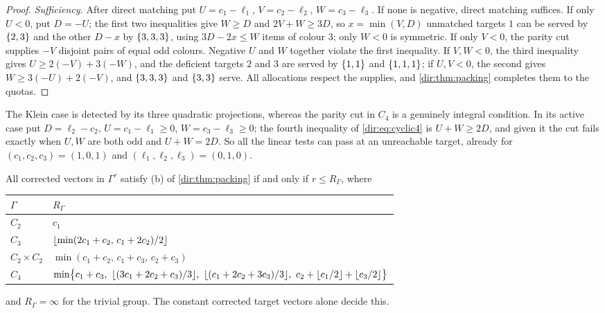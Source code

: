 \begin{proof}
\emph{Sufficiency.} After direct matching put $U=c_1-\ell_1$, $V=c_2-\ell_2$, $W=c_3-\ell_3$. If none is
negative, direct matching suffices. If only $U<0$, put $D=-U$; the first two inequalities give $W\ge D$ and
$2V+W\ge3D$, so $x=\min(V,D)$ unmatched targets $1$ can be served by $\{2,3\}$ and the other $D-x$ by
$\{3,3,3\}$, using $3D-2x\le W$ items of colour $3$; only $W<0$ is symmetric. If only $V<0$, the parity cut
supplies $-V$ disjoint pairs of equal odd colours. Negative $U$ and $W$ together violate the first
inequality. If $V,W<0$, the third inequality gives $U\ge2(-V)+3(-W)$, and the deficient targets $2$ and $3$ are
served by $\{1,1\}$ and $\{1,1,1\}$; if $U,V<0$, the second gives $W\ge3(-U)+2(-V)$, and $\{3,3,3\}$ and
$\{3,3\}$ serve. All allocations respect the supplies, and \cref{dir:thm:packing} completes them to the
quotas.
\end{proof}

The Klein case is detected by its three quadratic projections, whereas the parity cut in $C_4$ is a genuinely
integral condition. In its active case put $D=\ell_2-c_2$, $U=c_1-\ell_1\ge0$, $W=c_3-\ell_3\ge0$; the fourth
inequality of \eqref{dir:eq:cyclic4} is $U+W\ge2D$, and given it the cut fails exactly when $U,W$ are both odd
and $U+W=2D$. So all the linear tests can pass at an unreachable target, already for $(c_1,c_2,c_3)=(1,0,1)$
and $(\ell_1,\ell_2,\ell_3)=(0,1,0)$.

\begin{theorem}\label{dir:thm:capacity}
All corrected vectors in $\Gamma^r$ satisfy \textup{(b)} of \cref{dir:thm:packing} if and only if $r\le R_\Gamma$,
where
\begin{center}\small
\begin{tabular}{@{}ll@{}}
\toprule
$\Gamma$ & $R_\Gamma$\\
\midrule
$C_2$ & $c_1$\\
$C_3$ & $\lfloor\min(2c_1+c_2,\,c_1+2c_2)/2\rfloor$\\
$C_2\times C_2$ & $\min(c_1+c_2,\,c_1+c_3,\,c_2+c_3)$\\
$C_4$ & $\min\bigl\{c_1+c_3,\ \floor{(3c_1+2c_2+c_3)/3},\ \floor{(c_1+2c_2+3c_3)/3},\ c_2+\floor{c_1/2}+\floor{c_3/2}\bigr\}$\\
\bottomrule
\end{tabular}
\end{center}
and $R_\Gamma=\infty$ for the trivial group. The constant corrected target vectors alone decide this.
\end{theorem}

